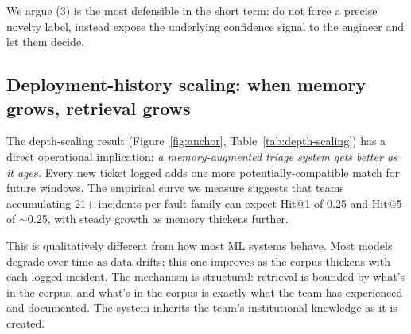 We argue (3) is the most defensible in the short term: do not force a precise novelty label, instead expose the underlying confidence signal to the engineer and let them decide.

\subsection{Deployment-history scaling: when memory grows, retrieval grows}

The depth-scaling result (Figure~\ref{fig:anchor}, Table~\ref{tab:depth-scaling}) has a direct operational implication: \emph{a memory-augmented triage system gets better as it ages.} Every new ticket logged adds one more potentially-compatible match for future windows. The empirical curve we measure suggests that teams accumulating 21+ incidents per fault family can expect Hit@1 of 0.25 and Hit@5 of $\sim$0.25, with steady growth as memory thickens further.

This is qualitatively different from how most ML systems behave. Most models degrade over time as data drifts; this one improves as the corpus thickens with each logged incident. The mechanism is structural: retrieval is bounded by what's in the corpus, and what's in the corpus is exactly what the team has experienced and documented. The system inherits the team's institutional knowledge as it is created.
